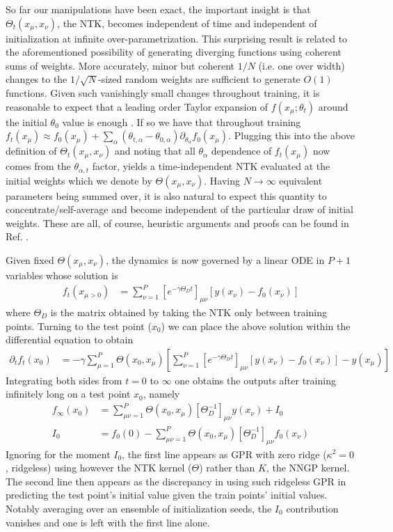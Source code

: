 So far our manipulations have been exact, the important insight is that $\Theta_t(x_{\mu},x_{\nu})$, the NTK, becomes independent of time and independent of initialization at infinite over-parametrization. This surprising result is related to the aforementioned possibility of generating diverging functions using coherent sums of weights. More accurately, minor but coherent $1/N$ (i.e. one over width) changes to the $1/\sqrt{N}$-sized random weights are sufficient to generate $O(1)$ functions. Given such vanishingly small changes throughout training, it is reasonable to expect that a leading order Taylor expansion of $f(x_{\mu};\theta_t)$ around the initial $\theta_0$ value is enough \citep{lee2019wide}. If so we have that throughout training  $f_{t}(x_{\mu})\approx f_{0} (x_{\mu})+\sum_{\alpha}(\theta_{t,\alpha}-\theta_{0,\alpha})\partial_{\theta_{\alpha}}f_{0}(x_{\mu})$. Plugging this into the above definition of $\Theta_t(x_{\mu},x_{\nu})$ and noting that all $\theta_{\alpha}$ dependence of $f_t(x_{\mu})$ now comes from the $\theta_{\alpha,t}$ factor, yields a time-independent NTK evaluated at the initial weights which we denote by $\Theta(x_{\mu},x_{\nu})$. Having $N \rightarrow \infty$ equivalent parameters being summed over, it is also natural to expect this quantity to concentrate/self-average and become independent of the particular draw of initial weights. These are all, of course, heuristic arguments and proofs can be found in Ref. \cite{jacot2018neural}. 

Given fixed $\Theta(x_{\mu},x_{\nu})$, the dynamics is now governed by a linear ODE in $P+1$ variables whose solution is  
\begin{align}
f_{t}(x_{\mu>0}) &= \sum_{\nu=1}^P [e^{-\gamma \Theta_D t}]_{\mu \nu}
 [y(x_{\nu})-f_{0}(x_{\nu})]
\end{align}
where $\Theta_D$ is the matrix obtained by taking the NTK only between training points. Turning to the test point ($x_0$) we can place the above solution within the differential equation to obtain
\begin{align}
\partial_t f_{t}(x_0) &= -\gamma \sum_{\mu=1}^P \Theta(x_0,x_{\mu}) \left[\sum_{\nu=1}^P [e^{-\gamma \Theta_D t}]_{\mu \nu}
 [y(x_{\nu})-f_{0}(x_{\nu})]-y(x_{\mu})\right] 
\end{align}
Integrating both sides from $t=0$ to $\infty$ one obtains the outputs after training infinitely long on a test point $x_0$, namely
\begin{align}
\label{Eq:NTKInfiniteTime}
f_{\infty}(x_0) &= \sum_{\mu \nu=1}^P \Theta(x_0,x_{\mu}) [\Theta_D^{-1}]_{\mu \nu} y(x_{\nu}) + I_0 \\ \nonumber
I_0 &= f_0(0)-\sum_{\mu \nu=1}^P \Theta(x_0,x_{\mu}) [\Theta_D^{-1}]_{\mu \nu} f_{0}(x_{\nu})
\end{align}
Ignoring for the moment $I_0$, the first line appears as GPR with zero ridge ($\kappa^2=0$, ridgeless) using however the NTK kernel ($\Theta$) rather than $K$, the NNGP kernel. The second line then appears as the discrepancy in using such ridgeless GPR in predicting the test point's initial value given the train points' initial values. Notably averaging over an ensemble of initialization seeds, the $I_0$ contribution vanishes and one is left with the first line alone. 

